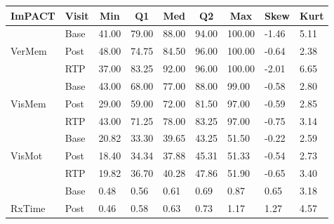 
\begin{tabular}{lllllllll}
\multicolumn{1}{c}{ImPACT} & \multicolumn{1}{c}{Visit} & \multicolumn{1}{c}{Min} & \multicolumn{1}{c}{Q1} & \multicolumn{1}{c}{Med} & \multicolumn{1}{c}{Q2} & \multicolumn{1}{c}{Max} & \multicolumn{1}{c}{Skew} & \multicolumn{1}{c}{Kurt} \\ \hline
 & \multicolumn{1}{l|}{Base} & 41.00 & 79.00 & 88.00 & 94.00 & 100.00 & -1.46 & 5.11 \\
VerMem & \multicolumn{1}{l|}{\cellcolor[HTML]{C0C0C0}Post} & \cellcolor[HTML]{C0C0C0}48.00 & \cellcolor[HTML]{C0C0C0}74.75 & \cellcolor[HTML]{C0C0C0}84.50 & \cellcolor[HTML]{C0C0C0}96.00 & \cellcolor[HTML]{C0C0C0}100.00 & \cellcolor[HTML]{C0C0C0}-0.64 & \cellcolor[HTML]{C0C0C0}2.38 \\
 & \multicolumn{1}{l|}{RTP} & 37.00 & 83.25 & 92.00 & 96.00 & 100.00 & -2.01 & 6.65 \\
\rowcolor[HTML]{EFEFEF}
 & \multicolumn{1}{l|}{\cellcolor[HTML]{EFEFEF}Base} & 43.00 & 68.00 & 77.00 & 88.00 & 99.00 & -0.58 & 2.80 \\
\rowcolor[HTML]{C0C0C0}
\cellcolor[HTML]{EFEFEF}VisMem & \multicolumn{1}{l|}{\cellcolor[HTML]{C0C0C0}Post} & 29.00 & 59.00 & 72.00 & 81.50 & 97.00 & -0.59 & 2.85 \\
\rowcolor[HTML]{EFEFEF}
 & \multicolumn{1}{l|}{\cellcolor[HTML]{EFEFEF}RTP} & 43.00 & 71.25 & 78.00 & 83.25 & 97.00 & -0.75 & 3.14 \\
 & \multicolumn{1}{l|}{Base} & 20.82 & 33.30 & 39.65 & 43.25 & 51.50 & -0.22 & 2.59 \\
VisMot & \multicolumn{1}{l|}{\cellcolor[HTML]{C0C0C0}Post} & \cellcolor[HTML]{C0C0C0}18.40 & \cellcolor[HTML]{C0C0C0}34.34 & \cellcolor[HTML]{C0C0C0}37.88 & \cellcolor[HTML]{C0C0C0}45.31 & \cellcolor[HTML]{C0C0C0}51.33 & \cellcolor[HTML]{C0C0C0}-0.54 & \cellcolor[HTML]{C0C0C0}2.73 \\
 & \multicolumn{1}{l|}{RTP} & 19.82 & 36.70 & 40.28 & 47.86 & 51.90 & -0.65 & 3.40 \\
\rowcolor[HTML]{EFEFEF}
 & \multicolumn{1}{l|}{\cellcolor[HTML]{EFEFEF}Base} & 0.48 & 0.56 & 0.61 & 0.69 & 0.87 & 0.65 & 3.18 \\
\rowcolor[HTML]{C0C0C0}
\cellcolor[HTML]{EFEFEF}RxTime & \multicolumn{1}{l|}{\cellcolor[HTML]{C0C0C0}Post} & 0.46 & 0.58 & 0.63 & 0.73 & 1.17 & 1.27 & 4.57 \\

\end{tabular}

